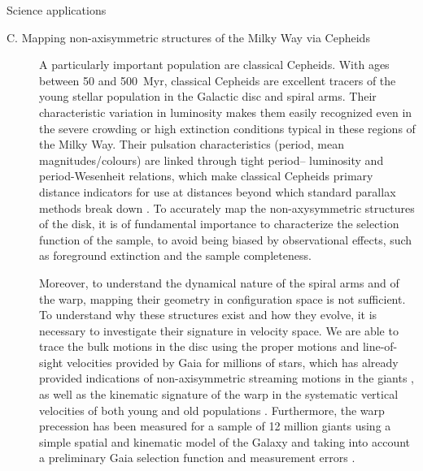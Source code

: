 \begin{workpackage}{Science applications}
\begin{wpobjectives}
\begin{description}
     \item[C. Mapping non-axisymmetric structures of the Milky Way via Cepheids]
        {A particularly important population are classical Cepheids. With ages between 50 and 500~Myr, classical Cepheids are excellent tracers of the young stellar population in the Galactic disc and spiral arms. Their characteristic variation in luminosity makes them easily recognized even in the severe crowding or high extinction conditions typical in these regions of the Milky Way. Their pulsation characteristics (period, mean magnitudes/colours) are linked through tight period– luminosity and period-Wesenheit relations, which make classical Cepheids primary distance indicators for use at distances beyond which standard parallax methods break down \cite{Clementini2019, Inno2013}. To accurately map the non-axysymmetric structures of the disk, it is of fundamental importance to characterize the selection function of the sample, to avoid being biased by observational effects, such as foreground extinction and the sample completeness. 
        
        Moreover, to understand the dynamical nature of the spiral arms and of the warp, mapping their geometry in configuration space is not sufficient. To understand why these structures exist and how they evolve, it is necessary to investigate their signature in velocity space. We are able to trace the bulk motions in the disc using the proper motions and line-of-sight velocities provided by Gaia for millions of stars, which has already provided indications of non-axisymmetric streaming motions in the giants \citep[see Fig.\ 5 in][]{Katz2018a}, as well as the kinematic signature of the warp in the systematic vertical velocities of both young and old populations \cite{Poggio2018}. Furthermore, the warp precession has been measured for a sample of 12 million giants using a simple spatial and kinematic model of the Galaxy and taking into account a preliminary Gaia selection function and measurement errors \cite{Poggio2020}. 
        
}
\end{description}
\end{wpobjectives}
\end{workpackage}
